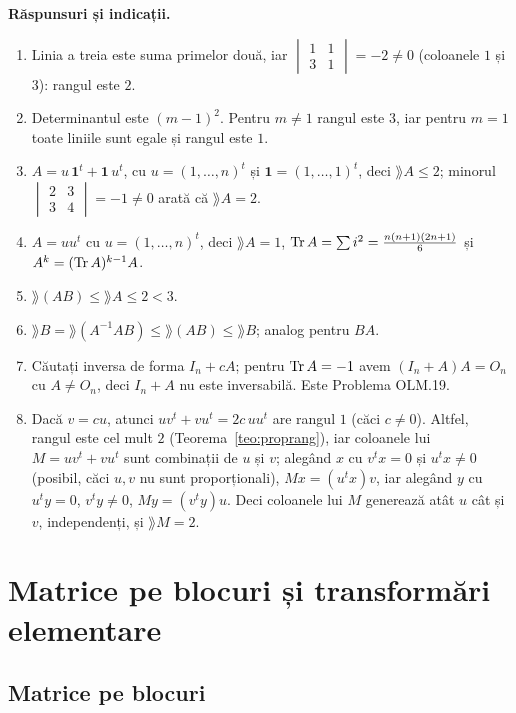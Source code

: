 \medskip\noindent\textbf{Răspunsuri și indicații.}
\begin{enumerate}[label=\textbf{\arabic*.},leftmargin=*]
\item Linia a treia este suma primelor două, iar $\begin{vmatrix}1&1\\3&1\end{vmatrix}=-2\neq0$ (coloanele $1$ și $3$): rangul este $2$.
\item Determinantul este $(m-1)^2$. Pentru $m\neq1$ rangul este $3$, iar pentru $m=1$ toate liniile sunt egale și rangul este $1$.
\item $A=u\,\mathbf 1^t+\mathbf 1\,u^t$, cu $u=(1,\dots,n)^t$ și $\mathbf 1=(1,\dots,1)^t$, deci $\rang A\le2$; minorul $\begin{vmatrix}2&3\\3&4\end{vmatrix}=-1\neq0$ arată că $\rang A=2$.
\item $A=uu^t$ cu $u=(1,\dots,n)^t$, deci $\rang A=1$, $\operatorname{Tr} A=\sum i^2=\frac{n(n+1)(2n+1)}6$ și $A^k=(\operatorname{Tr} A)^{k-1}A$.
\item $\rang(AB)\le\rang A\le2<3$.
\item $\rang B=\rang(A^{-1}AB)\le\rang(AB)\le\rang B$; analog pentru $BA$.
\item Căutați inversa de forma $I_n+cA$; pentru $\operatorname{Tr} A=-1$ avem $(I_n+A)A=O_n$ cu $A\neq O_n$, deci $I_n+A$ nu este inversabilă. Este Problema OLM.19.
\item Dacă $v=cu$, atunci $uv^t+vu^t=2c\,uu^t$ are rangul $1$ (căci $c\neq0$). Altfel, rangul este cel mult $2$ (Teorema~\ref{teo:proprang}), iar coloanele lui $M=uv^t+vu^t$ sunt combinații de $u$ și $v$; alegând $x$ cu $v^tx=0$ și $u^tx\neq0$ (posibil, căci $u,v$ nu sunt proporționali), $Mx=(u^tx)v$, iar alegând $y$ cu $u^ty=0$, $v^ty\neq0$, $My=(v^ty)u$. Deci coloanele lui $M$ generează atât $u$ cât și $v$, independenți, și $\rang M=2$.
\end{enumerate}

\chapter{Matrice pe blocuri și transformări elementare}\label{ch:blocuri}

\section{Matrice pe blocuri}

